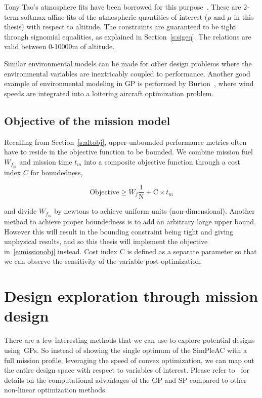 Tony Tao's atmosphere fits have been borrowed for this purpose~\cite{tao_thesis}. These are
2-term softmax-affine fits of the atmospheric
quantities of interest ($\rho$ and $\mu$ in this thesis) with respect to altitude. The constraints
are guaranteed to be tight through signomial equalities, as explained in Section~\ref{s:sigeq}.
The relations are valid between 0-10000m of altitude.

Similar environmental models can be made for other design problems where the environmental
variables are inextricably coupled to performance. Another good example of environmental modeling
in \gls{GP} is performed by Burton~\cite{gassolar}, where wind speeds are integrated into
a loitering aircraft optimization problem.

\subsection{Objective of the mission model}
\label{s:missionobj}

Recalling from Section~\ref{s:altobj}, upper-unbounded performance metrics often have to
reside in the objective function to be bounded. We combine mission fuel $W_{f_m}$ and mission time $t_m$
into a composite objective function through a cost index $C$ for boundedness,

\begin{equation}
    \mathrm{Objective} \geq W_f \frac{1}{\mathrm{N}} + \mathrm{C} \times t_m
    \label{e:missionobj}
\end{equation}

and divide $W_{f_m}$ by newtons to achieve uniform units (non-dimensional).
Another method to achieve proper boundedness is to add an arbitrary large upper bound. However
this will result in the bounding constraint being tight and giving unphysical results, and so
this thesis will implement the objective in~\ref{e:missionobj} instead.
Cost index $\mathrm{C}$ is defined as a separate parameter so that we can observe the sensitivity
of the variable post-optimization.

\section{Design exploration through mission design}

There are a few interesting methods that we can use to explore
potential designs using~\gls{GP}s. So instead of showing the single optimum of the
SimPleAC with a full mission profile, leveraging the speed of convex optimization,
we can map out the entire design space with respect to variables of interest.
Please refer to~\cite{power_of_log} for details on the computational advantages of the \gls{GP}
and \gls{SP} compared to other non-linear optimization methods.

